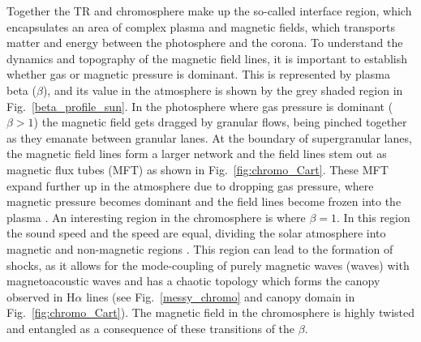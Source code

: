 Together the TR and chromosphere make up the so-called interface region, which encapsulates an area of complex plasma and magnetic fields, which transports matter and energy between the photosphere and the corona. To understand the dynamics and topography of the magnetic field lines, it is important to establish whether gas or magnetic pressure is dominant. This is represented by plasma beta ($\beta$), and its value in the atmosphere is shown by the grey shaded region in Fig.~\ref{beta_profile_sun}. In the photosphere where gas pressure is dominant ($\beta>1$) the magnetic field gets dragged by granular flows, being pinched together as they emanate between granular lanes. At the boundary of supergranular lanes, the magnetic field lines form a larger network and the field lines stem out as magnetic flux tubes (MFT) as shown in Fig.~\ref{fig:chromo_Cart}. These MFT expand further up in the atmosphere due to dropping gas pressure, where magnetic pressure becomes dominant and the field lines become frozen into the plasma \citep{Ayres2009astro2010S9A}. An interesting region in the chromosphere is where $\beta=1$. In this region the sound speed and the \Alfven speed are equal, dividing the solar atmosphere into magnetic and non-magnetic regions \citep{Tsiropoula2012}. This region can lead to the formation of shocks, as it allows for the mode-coupling of purely magnetic waves (\Alfven waves) with magnetoacoustic waves \citep{Hollweg1982SoPh7535H, Rosenthal2002ApJ564508R,Bogdan2003ApJ599626B, Cally2008SoPh251251C, Wang2020ApJ891110W} and has a chaotic topology which forms the canopy observed in H$\alpha$ lines (see Fig.~\ref{messy_chromo} and canopy domain in Fig.~\ref{fig:chromo_Cart}). The magnetic field in the chromosphere is highly twisted and entangled as a consequence of these transitions of the $\beta$. \np
%
